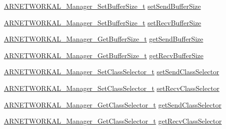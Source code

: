 \begin{DoxyCompactItemize}
\item 
\hyperlink{_a_r_n_e_t_w_o_r_k_a_l___manager_8h_ade8b0544989b4ae18a7eee0d6cf0af11}{A\+R\+N\+E\+T\+W\+O\+R\+K\+A\+L\+\_\+\+Manager\+\_\+\+Set\+Buffer\+Size\+\_\+t} \hyperlink{struct_a_r_n_e_t_w_o_r_k_a_l___manager__t_a871c488a67e1f9c8b322e2c968c46909}{set\+Send\+Buffer\+Size}
\item 
\hyperlink{_a_r_n_e_t_w_o_r_k_a_l___manager_8h_ade8b0544989b4ae18a7eee0d6cf0af11}{A\+R\+N\+E\+T\+W\+O\+R\+K\+A\+L\+\_\+\+Manager\+\_\+\+Set\+Buffer\+Size\+\_\+t} \hyperlink{struct_a_r_n_e_t_w_o_r_k_a_l___manager__t_a35e32dbc1e76f72b94706d95ec1c2a95}{set\+Recv\+Buffer\+Size}
\item 
\hyperlink{_a_r_n_e_t_w_o_r_k_a_l___manager_8h_a4679720d5710aade1355c8894d19a317}{A\+R\+N\+E\+T\+W\+O\+R\+K\+A\+L\+\_\+\+Manager\+\_\+\+Get\+Buffer\+Size\+\_\+t} \hyperlink{struct_a_r_n_e_t_w_o_r_k_a_l___manager__t_abe116f7042499d9c71eaf328acc84f16}{get\+Send\+Buffer\+Size}
\item 
\hyperlink{_a_r_n_e_t_w_o_r_k_a_l___manager_8h_a4679720d5710aade1355c8894d19a317}{A\+R\+N\+E\+T\+W\+O\+R\+K\+A\+L\+\_\+\+Manager\+\_\+\+Get\+Buffer\+Size\+\_\+t} \hyperlink{struct_a_r_n_e_t_w_o_r_k_a_l___manager__t_a89c2d94024c8bd82e7435e8026622a7d}{get\+Recv\+Buffer\+Size}
\item 
\hyperlink{_a_r_n_e_t_w_o_r_k_a_l___manager_8h_acc477cc0e93047b75d24c62831794b5a}{A\+R\+N\+E\+T\+W\+O\+R\+K\+A\+L\+\_\+\+Manager\+\_\+\+Set\+Class\+Selector\+\_\+t} \hyperlink{struct_a_r_n_e_t_w_o_r_k_a_l___manager__t_a400452281f96922451dd7fc08a2a06d6}{set\+Send\+Class\+Selector}
\item 
\hyperlink{_a_r_n_e_t_w_o_r_k_a_l___manager_8h_acc477cc0e93047b75d24c62831794b5a}{A\+R\+N\+E\+T\+W\+O\+R\+K\+A\+L\+\_\+\+Manager\+\_\+\+Set\+Class\+Selector\+\_\+t} \hyperlink{struct_a_r_n_e_t_w_o_r_k_a_l___manager__t_aceedcb0ebe0df89712d6d6346e62e46e}{set\+Recv\+Class\+Selector}
\item 
\hyperlink{_a_r_n_e_t_w_o_r_k_a_l___manager_8h_aba3939923aa2b5b9ab39781c6ae55156}{A\+R\+N\+E\+T\+W\+O\+R\+K\+A\+L\+\_\+\+Manager\+\_\+\+Get\+Class\+Selector\+\_\+t} \hyperlink{struct_a_r_n_e_t_w_o_r_k_a_l___manager__t_afde7bbf49b1e2c7cc715b77340793017}{get\+Send\+Class\+Selector}
\item 
\hyperlink{_a_r_n_e_t_w_o_r_k_a_l___manager_8h_aba3939923aa2b5b9ab39781c6ae55156}{A\+R\+N\+E\+T\+W\+O\+R\+K\+A\+L\+\_\+\+Manager\+\_\+\+Get\+Class\+Selector\+\_\+t} \hyperlink{struct_a_r_n_e_t_w_o_r_k_a_l___manager__t_ae6d2e24e5ea7a4f60f591c820ec455da}{get\+Recv\+Class\+Selector}

\end{DoxyCompactItemize}
